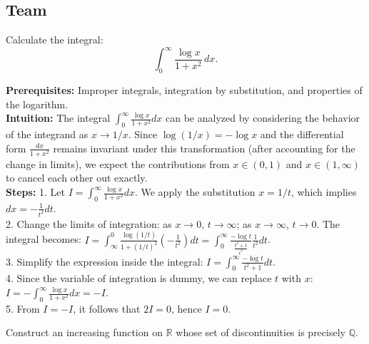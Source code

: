 \subsection{Team}

\begin{exercise}
\label{analysis:2014:7}
Calculate the integral:
\[
\int_0^{\infty} \frac{\log x}{1+x^2}\,dx.
\]
\end{exercise}

\begin{solution}
\textbf{Prerequisites:} Improper integrals, integration by substitution, and properties of the logarithm. \\[1em]
\textbf{Intuition:} The integral $\int_0^{\infty} \frac{\log x}{1+x^2} dx$ can be analyzed by considering the behavior of the integrand as $x \to 1/x$. Since $\log(1/x) = -\log x$ and the differential form $\frac{dx}{1+x^2}$ remains invariant under this transformation (after accounting for the change in limits), we expect the contributions from $x \in (0, 1)$ and $x \in (1, \infty)$ to cancel each other out exactly. \\[1em]
\textbf{Steps:}
1. Let $I = \int_0^{\infty} \frac{\log x}{1+x^2} dx$. We apply the substitution $x = 1/t$, which implies $dx = -\frac{1}{t^2} dt$. \\[1em]
2. Change the limits of integration: as $x \to 0$, $t \to \infty$; as $x \to \infty$, $t \to 0$. The integral becomes:
$I = \int_{\infty}^0 \frac{\log(1/t)}{1+(1/t)^2} \left( -\frac{1}{t^2} \right) dt = \int_0^{\infty} \frac{-\log t}{\frac{t^2+1}{t^2}} \frac{1}{t^2} dt$. \\[1em]
3. Simplify the expression inside the integral:
$I = \int_0^{\infty} \frac{-\log t}{t^2+1} dt$. \\[1em]
4. Since the variable of integration is dummy, we can replace $t$ with $x$:
$I = - \int_0^{\infty} \frac{\log x}{1+x^2} dx = -I$. \\[1em]
5. From $I = -I$, it follows that $2I = 0$, hence $I = 0$.
\end{solution}

\begin{exercise}
\label{analysis:2014:8}
Construct an increasing function on $\mathbb{R}$ whose set of discontinuities is precisely $\mathbb{Q}$.
\end{exercise}

